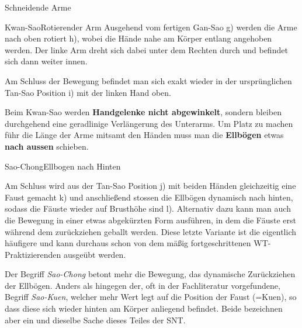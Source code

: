 \begin{WTSatz}{Schneidende Arme}
\begin{WTSatzTeil}{Kwan-Sao}{Rotierender Arm}
		Ausgehend vom fertigen Gan-Sao g) werden die Arme nach oben rotiert h), wobei die H\"ande nahe am K\"orper entlang angehoben werden. Der linke Arm dreht sich dabei unter dem Rechten durch und befindet sich dann weiter innen.
		
		Am Schluss der Bewegung befindet man sich exakt wieder in der urspr\"unglichen Tan-Sao Position i) mit der linken Hand oben.
		
		\begin{WTCommonNoob}
			Beim Kwan-Sao werden \textbf{Handgelenke nicht abgewinkelt}, sondern bleiben durchgehend eine geradlinige Verl\"angerung des Unterarms. Um Platz zu machen f\"uhr die L\"ange der Arme mitsamt den H\"anden muss man die \textbf{Ellb\"ogen} etwas \textbf{nach aussen} schieben.
		\end{WTCommonNoob}
	\end{WTSatzTeil}
	
	\begin{WTSatzTeil}{Sao-Chong}{Ellbogen nach Hinten}
		
		Am Schluss wird aus der Tan-Sao Position j) mit beiden H\"anden gleichzeitig eine Faust gemacht k) und anschlie{\ss}end stossen die Ellb\"ogen dynamisch nach hinten, sodass die F\"auste wieder auf Brusth\"ohe sind l). Alternativ dazu kann man auch die Bewegung in einer etwas abgek\"urzten Form ausf\"uhren, in dem die F\"auste erst w\"ahrend dem zur\"uckziehen geballt werden. Diese letzte Variante ist die eigentlich h\"aufigere und kann durchaus schon von dem m\"a{\ss}ig fortgeschrittenen WT-Praktizierenden ausge\"ubt werden.
		
		
		\begin{WTCommonBegriff}
			Der Begriff \textit{Sao-Chong} betont mehr die Bewegung, das dynamische Zur\"uckziehen der Ellb\"ogen. Anders als hingegen der, oft in der Fachliteratur vorgefundene, Begriff \textit{Sao-Kuen}, welcher mehr Wert legt auf die Position der Faust (=Kuen), so dass diese sich wieder hinten am K\"orper anliegend befindet. Beide bezeichnen aber ein und dieselbe Sache dieses Teiles der SNT.
		\end{WTCommonBegriff}

	\end{WTSatzTeil}
	
\end{WTSatz}


